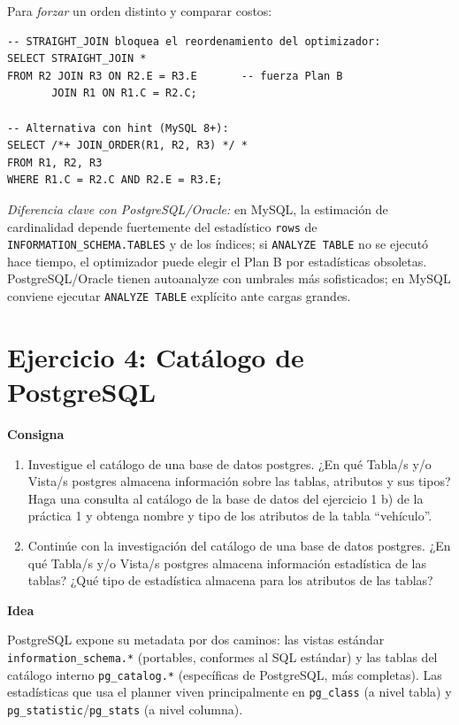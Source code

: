 \documentclass[11pt,a4paper]{article}
\newcommand{\itemcabecera}[1]{\noindent\textbf{#1}\par\medskip}
\newcommand{\bloqueConsigna}{\itemcabecera{Consigna}}
\newcommand{\bloqueIdea}{\itemcabecera{Idea}}
\begin{document}
Para \emph{forzar} un orden distinto y comparar costos:

\begin{lstlisting}
-- STRAIGHT_JOIN bloquea el reordenamiento del optimizador:
SELECT STRAIGHT_JOIN *
FROM R2 JOIN R3 ON R2.E = R3.E       -- fuerza Plan B
       JOIN R1 ON R1.C = R2.C;

-- Alternativa con hint (MySQL 8+):
SELECT /*+ JOIN_ORDER(R1, R2, R3) */ *
FROM R1, R2, R3
WHERE R1.C = R2.C AND R2.E = R3.E;
\end{lstlisting}

\textit{Diferencia clave con PostgreSQL/Oracle:} en MySQL, la estimación de cardinalidad depende fuertemente del estadístico \texttt{rows} de \texttt{INFORMATION\_SCHEMA.TABLES} y de los índices; si \texttt{ANALYZE TABLE} no se ejecutó hace tiempo, el optimizador puede elegir el Plan B por estadísticas obsoletas. PostgreSQL/Oracle tienen autoanalyze con umbrales más sofisticados; en MySQL conviene ejecutar \texttt{ANALYZE TABLE} explícito ante cargas grandes.

\section{Ejercicio 4: Catálogo de PostgreSQL}

\bloqueConsigna

\begin{enumerate}[label=\alph*),leftmargin=*]
    \item Investigue el catálogo de una base de datos postgres. ¿En qué Tabla/s y/o Vista/s postgres almacena información sobre las tablas, atributos y sus tipos? Haga una consulta al catálogo de la base de datos del ejercicio 1 b) de la práctica 1 y obtenga nombre y tipo de los atributos de la tabla ``vehículo''.
    \item Continúe con la investigación del catálogo de una base de datos postgres. ¿En qué Tabla/s y/o Vista/s postgres almacena información estadística de las tablas? ¿Qué tipo de estadística almacena para los atributos de las tablas?
\end{enumerate}

\bloqueIdea

PostgreSQL expone su metadata por dos caminos: las vistas estándar \texttt{information\_schema.*} (portables, conformes al SQL estándar) y las tablas del catálogo interno \texttt{pg\_catalog.*} (específicas de PostgreSQL, más completas). Las estadísticas que usa el planner viven principalmente en \texttt{pg\_class} (a nivel tabla) y \texttt{pg\_statistic}/\texttt{pg\_stats} (a nivel columna).
\end{document}
